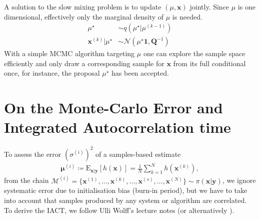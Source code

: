 A solution to the slow mixing problem is to update $(\mu, \bm{x})$ jointly.
Since $\mu$ is one dimensional, effectively only the marginal density of $\mu$ is needed.
\begin{align}
	\mu^{\star}  &\sim q (\mu^{\star}|	\mu^{(k-1)} ) \\
	\bm{x}^{(k)} | \mu^{\star} &\sim \mathcal{N} (	\mu^{\star}\bm{1}, \bm{Q}^{-1}) 
\end{align}
With a simple MCMC algorithm targeting  $ \mu$ one can explore the sample space efficiently and only draw a corresponding sample for $\bm{x}$ from its full conditional once, for instance, the proposal $\mu^{\star}$ has been accepted.

\section{On the Monte-Carlo Error and Integrated Autocorrelation time}
\label{ap:IATC}
To assess the error $(\sigma^{(i)})^2$ of a samples-based estimate 
\begin{align}
	\bm{\mu}^{(i)} \coloneqq	\text{E}_{\bm{x}|\bm{y}} [h(\bm{x})] = \frac{1}{N} \sum_{k=1}^{N} h(\bm{x}^{(k)}),
\end{align} 
from the chain $\mathcal{M}^{(i)} = \{\bm{x}^{(1)}, \dots,\bm{x}^{(k)},\dots, \bm{x}^{(s)},\dots, \bm{x}^{(N)}\} \sim \pi(\bm{x}|\bm{y})$, we ignore systematic error due to initialisation bias (burn-in period), but we have to take into account that samples produced by any system or algorithm are correlated.
To derive the IACT, we follow Ulli Wolff's lecture notes \cite{wolff2002LecNot} (or alternatively \cite{wolff2004monte}).

